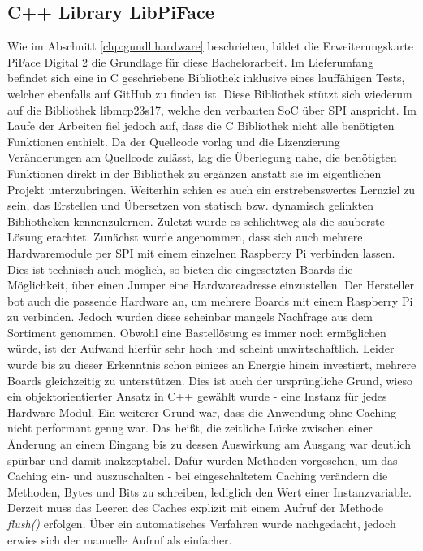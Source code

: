 \subsection{C++ Library LibPiFace}
Wie im Abschnitt \ref{chp:gundl:hardware} beschrieben, bildet die Erweiterungskarte PiFace Digital 2\cite{URL:PiFaceDigital2} die Grundlage für diese Bachelorarbeit. Im Lieferumfang befindet sich eine in C geschriebene Bibliothek inklusive eines lauffähigen Tests, welcher ebenfalls auf GitHub\cite{URL:PiFaceDigital2GIT} zu finden ist. Diese Bibliothek stützt sich wiederum auf die Bibliothek libmcp23s17\cite{URL:libmcp23s17}, welche den verbauten SoC über SPI anspricht. Im Laufe der Arbeiten fiel jedoch auf, dass die C Bibliothek nicht alle benötigten Funktionen enthielt. Da der Quellcode vorlag und die Lizenzierung Veränderungen am Quellcode zulässt, lag die Überlegung nahe, die benötigten Funktionen direkt in der Bibliothek zu ergänzen anstatt sie im eigentlichen Projekt unterzubringen. Weiterhin schien es auch ein erstrebenswertes Lernziel zu sein, das Erstellen und Übersetzen von statisch bzw. dynamisch gelinkten Bibliotheken kennenzulernen. Zuletzt wurde es schlichtweg als die sauberste Lösung erachtet. Zunächst wurde angenommen, dass sich auch mehrere Hardwaremodule per SPI mit einem einzelnen Raspberry Pi verbinden lassen. Dies ist technisch auch möglich, so bieten die eingesetzten Boards die Möglichkeit, über einen Jumper eine Hardwareadresse einzustellen. Der Hersteller bot auch die passende Hardware an, um mehrere Boards mit einem Raspberry Pi zu verbinden. Jedoch wurden diese scheinbar mangels Nachfrage aus dem Sortiment genommen. Obwohl eine Bastellösung es immer noch ermöglichen würde, ist der Aufwand hierfür sehr hoch und scheint unwirtschaftlich. Leider wurde bis zu dieser Erkenntnis schon einiges an Energie hinein investiert, mehrere Boards gleichzeitig zu unterstützen. Dies ist auch der ursprüngliche Grund, wieso ein objektorientierter Ansatz in C++ gewählt wurde - eine Instanz für jedes Hardware-Modul. Ein weiterer Grund war, dass die Anwendung ohne Caching nicht performant genug war. Das heißt, die zeitliche Lücke zwischen einer Änderung an einem Eingang bis zu dessen Auswirkung am Ausgang war deutlich spürbar und damit inakzeptabel. Dafür wurden Methoden vorgesehen, um das Caching ein- und auszuschalten - bei eingeschaltetem Caching verändern die Methoden, Bytes und Bits zu schreiben, lediglich den Wert einer Instanzvariable. Derzeit muss das Leeren des Caches explizit mit einem Aufruf der Methode \textit{flush()} erfolgen. Über ein automatisches Verfahren wurde nachgedacht, jedoch erwies sich der manuelle Aufruf als einfacher. 

